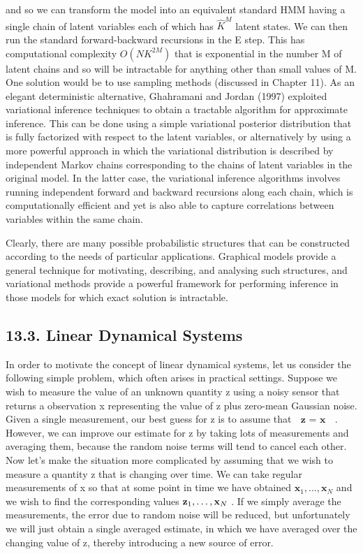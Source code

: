 \documentclass[
  10
]{article}
\begin{document}
and so we can transform the model into an equivalent standard HMM having
a single chain of latent variables each of which has
\(\hat { K } ^ { M }\) latent states. We can then run the standard
forward-backward recursions in the E step. This has computational
complexity \(O ( N K ^ { 2 M } )\) that is exponential in the number M
of latent chains and so will be intractable for anything other than
small values of M. One solution would be to use sampling methods
(discussed in Chapter 11). As an elegant deterministic alternative,
Ghahramani and Jordan (1997) exploited variational inference techniques
to obtain a tractable algorithm for approximate inference. This can be
done using a simple variational posterior distribution that is fully
factorized with respect to the latent variables, or alternatively by
using a more powerful approach in which the variational distribution is
described by independent Markov chains corresponding to the chains of
latent variables in the original model. In the latter case, the
variational inference algorithms involves running independent forward
and backward recursions along each chain, which is computationally
efficient and yet is also able to capture correlations between variables
within the same chain.

Clearly, there are many possible probabilistic structures that can be
constructed according to the needs of particular applications. Graphical
models provide a general technique for motivating, describing, and
analysing such structures, and variational methods provide a powerful
framework for performing inference in those models for which exact
solution is intractable.

\subsection{13.3. Linear Dynamical
Systems}\label{linear-dynamical-systems}

In order to motivate the concept of linear dynamical systems, let us
consider the following simple problem, which often arises in practical
settings. Suppose we wish to measure the value of an unknown quantity z
using a noisy sensor that returns a observation x representing the value
of z plus zero-mean Gaussian noise. Given a single measurement, our best
guess for z is to assume that \(\textbf { z } = \textbf { x }\) .
However, we can improve our estimate for z by taking lots of
measurements and averaging them, because the random noise terms will
tend to cancel each other. Now let's make the situation more complicated
by assuming that we wish to measure a quantity z that is changing over
time. We can take regular measurements of x so that at some point in
time we have obtained
\(\mathbf { x } _ { 1 } , \ldots , \mathbf { x } _ { N }\) and we wish
to find the corresponding values
\({ \bf z } _ { 1 } , \ldots , { \bf x } _ { N }\) . If we simply
average the measurements, the error due to random noise will be reduced,
but unfortunately we will just obtain a single averaged estimate, in
which we have averaged over the changing value of z, thereby introducing
a new source of error.
\end{document}
